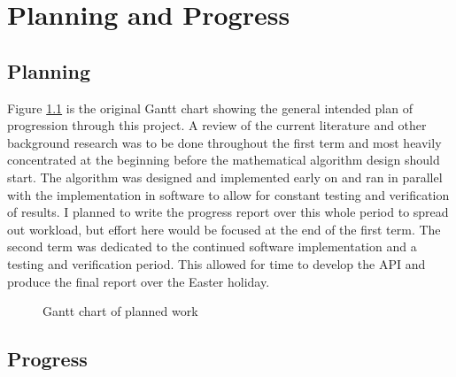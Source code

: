 \chapter{Planning and Progress}

\section{Planning}


Figure \ref{planningGantt} is the original Gantt chart showing the general intended plan of progression through this project. A review of the current literature and other background research was to be done throughout the first term and most heavily concentrated at the beginning before the mathematical algorithm design should start. The algorithm was designed and implemented early on and ran in parallel with the implementation in software to allow for constant testing and verification of results. I planned to write the progress report over this whole period to spread out workload, but effort here would be focused at the end of the first term. The second term was dedicated to the continued software implementation and a testing and verification period. This allowed for time to develop the API and produce the final report over the Easter holiday. 

\begin{figure}[ht!]
    \caption{Gantt chart of planned work}
    \label{planningGantt}
\end{figure}

\section{Progress}

